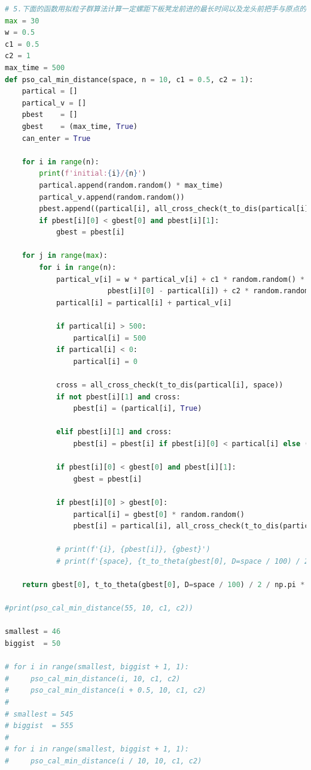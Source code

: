 \documentclass[a4paper]{article}
\begin{document}
\begin{lstlisting}[language=python,columns=fullflexible,frame=shadowbox]
# 5.下面的函数用拟粒子群算法计算一定螺距下板凳龙前进的最长时间以及龙头前把手与原点的最近距离
max = 30
w = 0.5
c1 = 0.5
c2 = 1
max_time = 500
def pso_cal_min_distance(space, n = 10, c1 = 0.5, c2 = 1):
    partical = []
    partical_v = []
    pbest    = []
    gbest    = (max_time, True)
    can_enter = True

    for i in range(n):
        print(f'initial:{i}/{n}')
        partical.append(random.random() * max_time)
        partical_v.append(random.random())
        pbest.append((partical[i], all_cross_check(t_to_dis(partical[i], space))))
        if pbest[i][0] < gbest[0] and pbest[i][1]:
            gbest = pbest[i]

    for j in range(max):
        for i in range(n):
            partical_v[i] = w * partical_v[i] + c1 * random.random() * (
                        pbest[i][0] - partical[i]) + c2 * random.random() * (gbest[0] - partical[i])
            partical[i] = partical[i] + partical_v[i]

            if partical[i] > 500:
                partical[i] = 500
            if partical[i] < 0:
                partical[i] = 0

            cross = all_cross_check(t_to_dis(partical[i], space))
            if not pbest[i][1] and cross:
                pbest[i] = (partical[i], True)

            elif pbest[i][1] and cross:
                pbest[i] = pbest[i] if pbest[i][0] < partical[i] else (partical[i], cross)

            if pbest[i][0] < gbest[0] and pbest[i][1]:
                gbest = pbest[i]

            if pbest[i][0] > gbest[0]:
                partical[i] = gbest[0] * random.random()
                pbest[i] = partical[i], all_cross_check(t_to_dis(partical[i], space)) # if not best, go to a random smaller position

            # print(f'{i}, {pbest[i]}, {gbest}')
            # print(f'{space}, {t_to_theta(gbest[0], D=space / 100) / 2 / np.pi * space}')

    return gbest[0], t_to_theta(gbest[0], D=space / 100) / 2 / np.pi * space > 450 # can enter

#print(pso_cal_min_distance(55, 10, c1, c2))

smallest = 46
biggist  = 50

# for i in range(smallest, biggist + 1, 1):
#     pso_cal_min_distance(i, 10, c1, c2)
#     pso_cal_min_distance(i + 0.5, 10, c1, c2)
#
# smallest = 545
# biggist  = 555
#
# for i in range(smallest, biggist + 1, 1):
#     pso_cal_min_distance(i / 10, 10, c1, c2)


\end{lstlisting}
\end{document}
